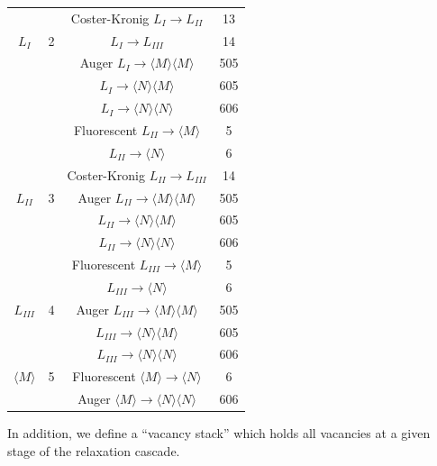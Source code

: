 \begin{table}[phtb]
\begin{center}
\begin{tabular}{|c|c|c|c|}
& & Coster-Kronig $L_I \to L_{II}$ & \phantom{0}13 \\
$L_I$ & 2 & \phantom{Coster-Kronig} $L_I \to L_{III}$ & \phantom{0}14 \\
& & Auger $L_I \to \langle M \rangle \langle M \rangle$ & 505 \\
& & \phantom{Auger} $L_I \to \langle N \rangle \langle M \rangle$ & 605 \\
& & \phantom{Auger} $L_I \to \langle N \rangle \langle N \rangle$ & 606 \\
\hline
& & Fluorescent $L_{II} \to \langle M \rangle$ & \phantom{00}5 \\
& & \phantom{Fluorescent} $L_{II} \to \langle N \rangle$ & \phantom{00}6 \\
& & Coster-Kronig $L_{II} \to L_{III} $ & \phantom{0}14 \\
$L_{II}$ & 3 & Auger $L_{II} \to \langle M \rangle \langle M \rangle$ & 505 \\
& & \phantom{Auger} $L_{II} \to \langle N \rangle \langle M \rangle$ & 605 \\
& & \phantom{Auger} $L_{II} \to \langle N \rangle \langle N \rangle$ & 606 \\
\hline
& & Fluorescent $L_{III} \to \langle M \rangle$ & \phantom{00}5 \\
& & \phantom{Fluorescent} $L_{III} \to \langle N \rangle$ & \phantom{00}6 \\
$L_{III}$ & 4 & Auger $L_{III} \to \langle M \rangle \langle M \rangle$ & 505 \\
& & \phantom{Auger} $L_{III} \to \langle N \rangle \langle M \rangle$ & 605 \\
& & \phantom{Auger} $L_{III} \to \langle N \rangle \langle N \rangle$ & 606 \\
\hline
$\langle M \rangle$ & 5 & Fluorescent
$\langle M \rangle \to \langle N \rangle$  & 6 \\
& & Auger $\langle M \rangle \to \langle N \rangle
\langle N \rangle$ & 606 \\
\hline \hline
\end{tabular}
\end{center}
\end{table}

In addition, we define a ``vacancy stack'' which holds all vacancies
at a given stage of the relaxation cascade.

